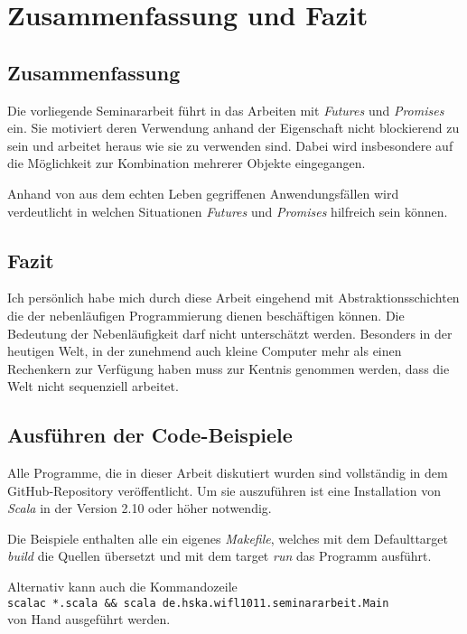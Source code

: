 \section{Zusammenfassung und Fazit}

\subsection{Zusammenfassung}

Die vorliegende Seminararbeit führt in das Arbeiten mit \emph{Futures}
und \emph{Promises} ein. Sie motiviert deren Verwendung anhand der
Eigenschaft nicht blockierend zu sein und arbeitet heraus wie sie
zu verwenden sind. Dabei wird insbesondere auf die Möglichkeit
zur Kombination mehrerer Objekte eingegangen.

Anhand von aus dem echten Leben gegriffenen Anwendungsfällen wird
verdeutlicht in welchen Situationen \emph{Futures} und \emph{Promises}
hilfreich sein können.

\subsection{Fazit}

Ich persönlich habe mich durch diese Arbeit eingehend mit 
Abstraktionsschichten die der nebenläufigen Programmierung dienen
beschäftigen können. Die Bedeutung der Nebenläufigkeit darf nicht
unterschätzt werden. Besonders in der heutigen Welt, in der zunehmend
auch kleine Computer mehr als einen Rechenkern zur Verfügung haben
muss zur Kentnis genommen werden, dass die Welt nicht sequenziell
arbeitet. 

\subsection{Ausführen der Code-Beispiele}

Alle Programme, die in dieser Arbeit diskutiert wurden sind 
vollständig in dem GitHub-Repository \cite{code} veröffentlicht.
Um sie auszuführen ist eine Installation von \emph{Scala} in der
Version 2.10 oder höher notwendig.

Die Beispiele enthalten alle ein eigenes \emph{Makefile}, welches
mit dem Defaulttarget \emph{build} die Quellen übersetzt und mit
dem target \emph{run} das Programm ausführt.

Alternativ kann auch die Kommandozeile \\
\texttt{scalac *.scala \&\& scala de.hska.wifl1011.seminararbeit.Main} \\
von Hand ausgeführt werden.
